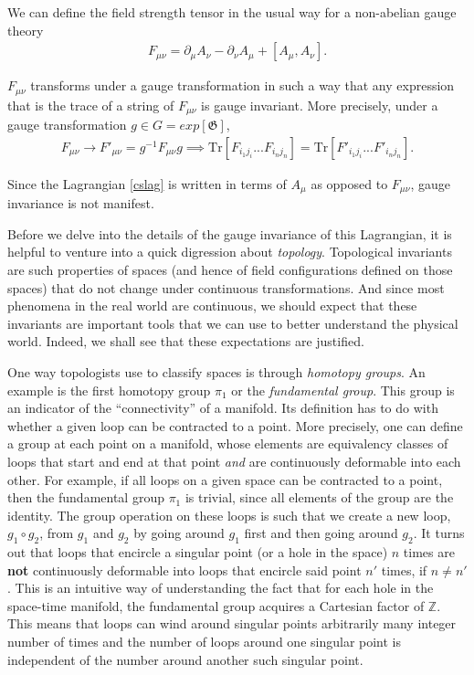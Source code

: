 We can define the field strength tensor in the usual way for a non-abelian gauge theory
\begin{align}
    F_{\mu \nu} = \partial_{\mu}A_{\nu} - \partial_{\nu} A_{\mu} + [A_{\mu}, A_{\nu}].
\end{align}




    $F_{\mu \nu}$ transforms under a gauge transformation in such a way that any expression that is the trace of a string of $F_{\mu \nu}$ is gauge invariant. More precisely, under a gauge transformation $g\in G=exp\left[\mathfrak{G} \right]$, 
\begin{align}
    F_{\mu \nu} \rightarrow F'_{\mu\nu} = g^{-1} F_{\mu \nu} g \implies \mathrm{Tr}\left[ F_{i_1 j_i} ...F_{i_n j_n} \right]= \mathrm{Tr} \left[F'_{i_1 j_i} ...F'_{i_n j_n} \right].
\end{align}

    Since the Lagrangian \eqref{cslag} is written in terms of $A_{\mu}$ as opposed to $F_{\mu \nu}$, gauge invariance is not manifest.


    Before we delve into the details of the gauge invariance of this Lagrangian, it is helpful to venture into a quick digression about \textit{topology}. Topological invariants are such properties of spaces (and hence of field configurations defined on those spaces) that do not change under continuous transformations. And since most phenomena in the real world are continuous, we should expect that these invariants are important tools that we can use to better understand the physical world. Indeed, we shall see that these expectations are justified. 

    One way topologists use to classify spaces is through \textit{homotopy groups}. An example is the first homotopy group $\pi_1$ or the \textit{fundamental group}. This group is an indicator of the ``connectivity'' of a manifold. Its definition has to do with whether a given loop can be contracted to a point. More precisely, one can define a group at each point on a manifold, whose elements are equivalency classes of loops that start and end at that point \textit{and} are continuously deformable into each other. For example, if all loops on a given space can be contracted to a point, then the fundamental group $\pi_1$ is trivial, since all elements of the group are the identity. The group operation on these loops is such that we create a new loop, $g_1 \circ g_2$, from $g_1$ and $g_2$ by going around $g_1$ first  and then going around $g_2$. It turns out that loops that encircle a singular point (or a hole in the space) $n$ times are \textbf{not} continuously deformable into loops that encircle said point $n'$ times, if $n \neq n'$. This is an intuitive way of understanding the fact that for each hole in the space-time manifold, the fundamental group acquires a Cartesian factor of $\mathbb{Z}$. This means that loops can wind around singular points arbitrarily many integer number of times and the number of loops around one singular point is independent of the number around another such singular point.

